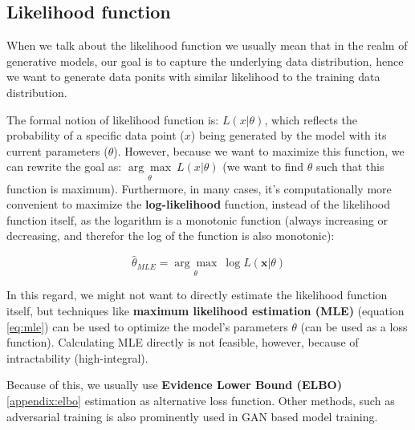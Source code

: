 \subsection{Likelihood function}
\label{appendix:likelihood_function}

When we talk about the likelihood function we usually mean that in the realm of generative models, our goal is to capture the underlying data distribution, hence we want to generate data ponits with similar likelihood to the training data distribution. 

The formal notion of likelihood function is: $L(x | \theta)$, which reflects the probability of a specific data point ($x$) being generated by the model with its current parameters ($\theta$). However, because we want to maximize this function, we can rewrite the goal as: $\underset{\theta}{\arg\max}\ L(x | \theta)$ (we want to find $\theta$ such that this function is maximum). Furthermore, in many cases, it's computationally more convenient to maximize the \textbf{log-likelihood} function, instead of the likelihood function itself, as the logarithm is a monotonic function (always increasing or decreasing, and therefor the log of the function is also monotonic):

\begin{equation}
\label{eq:mle}
    \hat{\theta}_{MLE} = \underset{\theta}{\arg\max} \ \log L(\mathbf{x} | \theta)
\end{equation}


In this regard, we might not want to directly estimate the likelihood function itself, but techniques like \textbf{maximum likelihood estimation (MLE)} (equation \ref{eq:mle}) can be used to optimize the model's parameters $\theta$ (can be used as a loss function). Calculating MLE directly is not feasible, however, because of intractability (high-integral).

Because of this, we usually use \textbf{Evidence Lower Bound (ELBO)} \ref{appendix:elbo} estimation as alternative loss function. Other methods, such as adversarial training is also prominently used in GAN based model training.